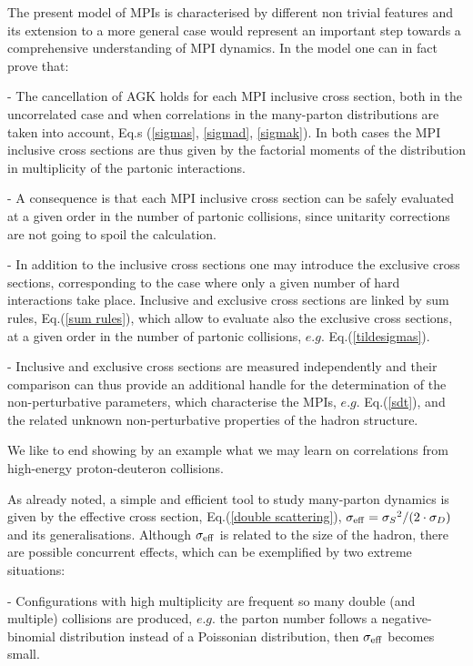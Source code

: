 \documentclass{ws-rv9x6}
\begin{document}
The present model of MPIs is characterised by different non trivial features and its extension to a more general case would represent an important step towards a comprehensive understanding of MPI dynamics. In the model one can in fact prove that:  

\noindent
- The cancellation of AGK\cite{Abramovsky:1973fm} holds for each MPI inclusive cross section, both in the uncorrelated case and when correlations in the many-parton distributions are taken into account, Eq.s (\ref{sigmas}, \ref{sigmad}, \ref{sigmak}). In both cases the MPI inclusive cross sections are thus given by the factorial moments of the distribution in multiplicity of the partonic interactions. 

\noindent
- A consequence is that each MPI inclusive cross section can be safely evaluated at a given order in the number of partonic collisions, since unitarity corrections are not going to spoil the calculation.

\noindent
- In addition to the inclusive cross sections one may introduce the exclusive cross sections, corresponding to the case where only a given number of hard interactions take place. Inclusive and exclusive cross sections are linked by sum rules, Eq.(\ref{sum rules}), which allow to evaluate also the exclusive cross sections, at a given order in the number of partonic collisions, $e.g.$ Eq.(\ref{tildesigmas}).

\noindent
- Inclusive and exclusive cross sections are measured independently and their comparison can thus provide an additional handle for the determination of the non-perturbative parameters, which characterise the MPIs, $e.g.$ Eq.(\ref{sdt}), and the related unknown non-perturbative properties of the hadron structure. 

We like to end showing by an example what we may learn on correlations from high-energy proton-deuteron collisions. 

As already noted, a simple and efficient tool to study many-parton dynamics is given by the effective cross section, Eq.(\ref{double scattering}), $\sigma_{\rm eff}={\sigma_S}^2/(2\cdot \sigma_D)$ and its generalisations. 
 Although $\sigma_{\rm eff}$ is related to the size of the hadron, there are possible concurrent effects, which can be exemplified by two extreme situations: 

\par{}- Configurations with high multiplicity are frequent so many double (and multiple) collisions are produced, $e.g.$ the parton number follows a negative-binomial distribution instead of a Poissonian distribution, then
 $\sigma_{\rm eff}$ becomes small.
 
\end{document}
